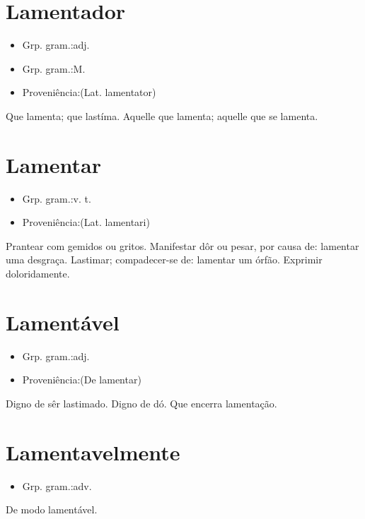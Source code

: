 \section{Lamentador}
\begin{itemize}
\item {Grp. gram.:adj.}
\end{itemize}
\begin{itemize}
\item {Grp. gram.:M.}
\end{itemize}
\begin{itemize}
\item {Proveniência:(Lat. \textunderscore lamentator\textunderscore )}
\end{itemize}
Que lamenta; que lastíma.
Aquelle que lamenta; aquelle que se lamenta.
\section{Lamentar}
\begin{itemize}
\item {Grp. gram.:v. t.}
\end{itemize}
\begin{itemize}
\item {Proveniência:(Lat. \textunderscore lamentari\textunderscore )}
\end{itemize}
Prantear com gemidos ou gritos.
Manifestar dôr ou pesar, por causa de: \textunderscore lamentar uma desgraça\textunderscore .
Lastimar; compadecer-se de: \textunderscore lamentar um órfão\textunderscore .
Exprimir doloridamente.
\section{Lamentável}
\begin{itemize}
\item {Grp. gram.:adj.}
\end{itemize}
\begin{itemize}
\item {Proveniência:(De \textunderscore lamentar\textunderscore )}
\end{itemize}
Digno de sêr lastimado.
Digno de dó.
Que encerra lamentação.
\section{Lamentavelmente}
\begin{itemize}
\item {Grp. gram.:adv.}
\end{itemize}
De modo lamentável.
